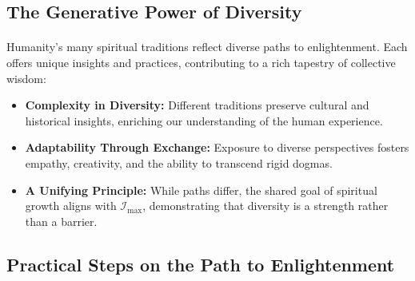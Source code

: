 \documentclass[12pt]{article}
\begin{document}
\subsection{The Generative Power of Diversity}
\paragraph{}
Humanity’s many spiritual traditions reflect diverse paths to enlightenment. Each offers unique insights and practices, contributing to a rich tapestry of collective wisdom:
\begin{itemize}
    \item \textbf{Complexity in Diversity:} Different traditions preserve cultural and historical insights, enriching our understanding of the human experience.
    \item \textbf{Adaptability Through Exchange:} Exposure to diverse perspectives fosters empathy, creativity, and the ability to transcend rigid dogmas.
    \item \textbf{A Unifying Principle:} While paths differ, the shared goal of spiritual growth aligns with \(\mathcal{I}_{\text{max}}\), demonstrating that diversity is a strength rather than a barrier.
\end{itemize}

\subsection{Practical Steps on the Path to Enlightenment}
\end{document}
